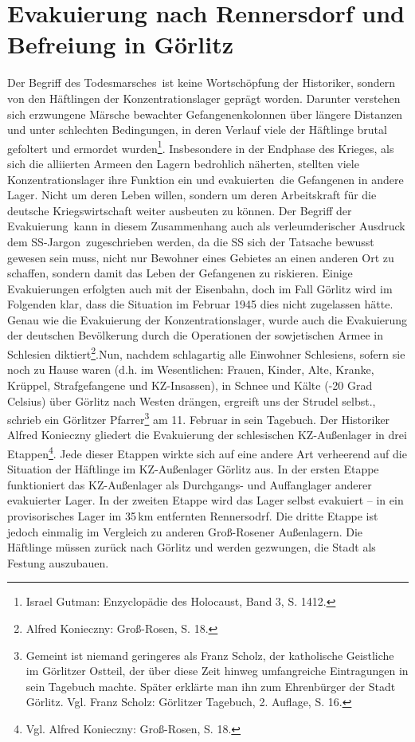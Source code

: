 \chapter{Evakuierung nach Rennersdorf und Befreiung in Görlitz}

Der Begriff des \glqq Todesmarsches\grqq~ist keine Wortschöpfung der Historiker, sondern von den Häftlingen der Konzentrationslager geprägt worden. Darunter verstehen sich erzwungene Märsche bewachter Gefangenenkolonnen über längere Distanzen und unter schlechten Bedingungen, in deren Verlauf viele der Häftlinge brutal gefoltert und ermordet wurden\footnote{Israel Gutman: Enzyclopädie des Holocaust, Band 3, S. 1412.}. Insbesondere in der Endphase des Krieges, als sich die alliierten Armeen den Lagern bedrohlich näherten, stellten viele Konzentrationslager ihre Funktion ein und \glqq evakuierten\grqq~die Gefangenen in andere Lager. Nicht um deren Leben willen, sondern um deren Arbeitskraft für die deutsche Kriegswirtschaft weiter ausbeuten zu können. Der Begriff der \glqq Evakuierung\grqq~kann in diesem Zusammenhang auch als verleumderischer Ausdruck dem \glqq SS-Jargon\grqq~zugeschrieben werden, da die SS sich der Tatsache bewusst gewesen sein muss, nicht nur Bewohner eines Gebietes an einen anderen Ort zu schaffen, sondern damit das Leben der Gefangenen zu riskieren. Einige Evakuierungen erfolgten auch mit der Eisenbahn, doch im Fall Görlitz wird im Folgenden klar, dass die Situation im Februar 1945 dies nicht zugelassen hätte.\newline
Genau wie die Evakuierung der Konzentrationslager, wurde auch die Evakuierung der deutschen Bevölkerung durch die Operationen der sowjetischen Armee in Schlesien diktiert\footnote{Alfred Konieczny: Groß-Rosen, S. 18.}.\glqq Nun, nachdem schlagartig alle Einwohner Schlesiens, sofern sie noch zu Hause waren (d.h. im Wesentlichen: Frauen, Kinder, Alte, Kranke, Krüppel, Strafgefangene und KZ-Insassen), in Schnee und Kälte (-20 Grad Celsius) über Görlitz nach Westen drängen, ergreift uns der Strudel selbst.\grqq, schrieb ein Görlitzer Pfarrer\footnote{Gemeint ist niemand geringeres als Franz Scholz, der katholische Geistliche im Görlitzer Ostteil, der über diese Zeit hinweg umfangreiche Eintragungen in sein Tagebuch machte. Später erklärte man ihn zum Ehrenbürger der Stadt Görlitz. Vgl. Franz Scholz: Görlitzer Tagebuch, 2. Auflage, S. 16.} am 11. Februar in sein Tagebuch. 
Der Historiker Alfred Konieczny gliedert die Evakuierung der schlesischen KZ-Außenlager in drei Etappen\footnote{Vgl. Alfred Konieczny: Groß-Rosen, S. 18.}. Jede dieser Etappen wirkte sich auf eine andere Art verheerend auf die Situation der Häftlinge im KZ-Außenlager Görlitz aus. In der ersten Etappe funktioniert das KZ-Außenlager als Durchgangs- und Auffanglager anderer evakuierter Lager. In der zweiten Etappe wird das Lager selbst evakuiert -- in ein provisorisches Lager im 35\,km entfernten Rennersodrf. Die dritte Etappe ist jedoch einmalig im Vergleich zu anderen Groß-Rosener Außenlagern. Die Häftlinge müssen zurück nach Görlitz und werden gezwungen, die Stadt als Festung auszubauen. 



